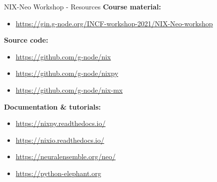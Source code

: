 \documentclass[pdftex]{beamer}
\begin{document}
\begin{frame}{NIX-Neo Workshop - Resources}
    \small
    \textbf{Course material:}
    \begin{itemize}
        \item \url{https://gin.g-node.org/INCF-workshop-2021/NIX-Neo-workshop}
    \end{itemize}
    \vspace{1ex}
    \textbf{Source code:}
    \begin{itemize}
        \item \url{https://github.com/g-node/nix}
        \item \url{https://github.com/g-node/nixpy}
        \item \url{https://github.com/g-node/nix-mx}
    \end{itemize}
    \vspace{1ex}
    \textbf{Documentation \& tutorials:}
    \begin{itemize}
        \item \url{https://nixpy.readthedocs.io/}
        \item \url{https://nixio.readthedocs.io/}
        \item \url{https://neuralensemble.org/neo/}
        \item \url{https://python-elephant.org}
    \end{itemize}
\end{frame}
\end{document}
